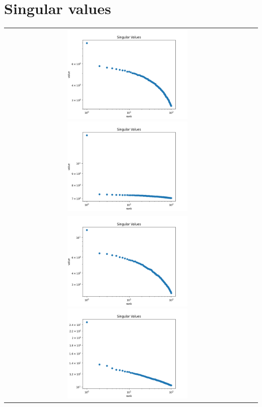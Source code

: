 \documentclass[12pt, letterpaper, twoside]{article}
\begin{document}
\section{Singular values}

\begin{center}
    \begin{longtable}{ c c }  
        \includegraphics[width=0.5\textwidth]{1S_svd.png} \includegraphics[width=0.5\textwidth]{1L_svd.png} \\
        \includegraphics[width=0.5\textwidth]{2S_svd.png} \includegraphics[width=0.5\textwidth]{2L_svd.png} \\

\end{longtable}
\end{center}
\end{document}

